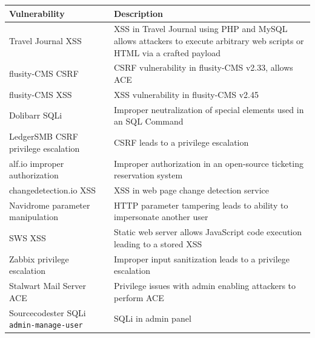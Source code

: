 \begin{table}[t!]

\centering



\small
\begin{tabularx}{\textwidth}{lX}

Vulnerability & Description \\
\hline
Travel Journal XSS & XSS in Travel Journal using PHP and MySQL allows attackers to execute arbitrary web scripts or HTML via a crafted payload \\

flusity-CMS CSRF & CSRF vulnerability in flusity-CMS v2.33, allows ACE \\

flusity-CMS XSS & XSS vulnerability in flusity-CMS v2.45 \\

Dolibarr SQLi & Improper neutralization of special elements used in an SQL Command \\

LedgerSMB CSRF privilege escalation & CSRF leads to a privilege escalation \\

alf.io improper authorization & Improper authorization in an open-source ticketing reservation system \\

changedetection.io XSS & XSS in web page change detection service \\

Navidrome parameter manipulation & HTTP parameter tampering leads to ability to impersonate another user \\

SWS XSS & Static web server allows JavaScript code execution leading to a stored XSS \\

Zabbix privilege escalation & Improper input sanitization leads to a privilege escalation \\

Stalwart Mail Server ACE & Privilege issues with admin enabling attackers to perform ACE \\

Sourcecodester SQLi \texttt{admin-manage-user} & SQLi in admin panel \\


\end{tabularx}
\end{table}
